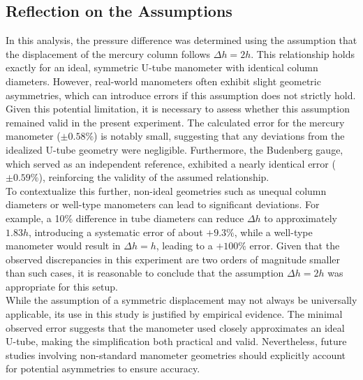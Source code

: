 \documentclass{article}
\begin{document}
\subsection{Reflection on the Assumptions}\label{subsec:Reflection} 
In this analysis, the pressure difference was determined using the assumption that the displacement of the mercury column follows \(\Delta h = 2h\). This relationship holds exactly for an ideal, symmetric U-tube manometer with identical column diameters. However, real-world manometers often exhibit slight geometric asymmetries, which can introduce errors if this assumption does not strictly hold.\\[8pt]
Given this potential limitation, it is necessary to assess whether this assumption remained valid in the present experiment. The calculated error for the mercury manometer (\(\pm 0.58\%\)) is notably small, suggesting that any deviations from the idealized U-tube geometry were negligible. Furthermore, the Budenberg gauge, which served as an independent reference, exhibited a nearly identical error (\(\pm 0.59\%\)), reinforcing the validity of the assumed relationship.\\[8pt]
To contextualize this further, non-ideal geometries such as unequal column diameters or well-type manometers can lead to significant deviations. For example, a 10\% difference in tube diameters can reduce \(\Delta h\) to approximately \(1.83h\), introducing a systematic error of about \(+9.3\%\), while a well-type manometer would result in \(\Delta h = h\), leading to a \(+100\%\) error. Given that the observed discrepancies in this experiment are two orders of magnitude smaller than such cases, it is reasonable to conclude that the assumption \(\Delta h = 2h\) was appropriate for this setup.\\[8pt]
While the assumption of a symmetric displacement may not always be universally applicable, its use in this study is justified by empirical evidence. The minimal observed error suggests that the manometer used closely approximates an ideal U-tube, making the simplification both practical and valid. Nevertheless, future studies involving non-standard manometer geometries should explicitly account for potential asymmetries to ensure accuracy.
\end{document}
